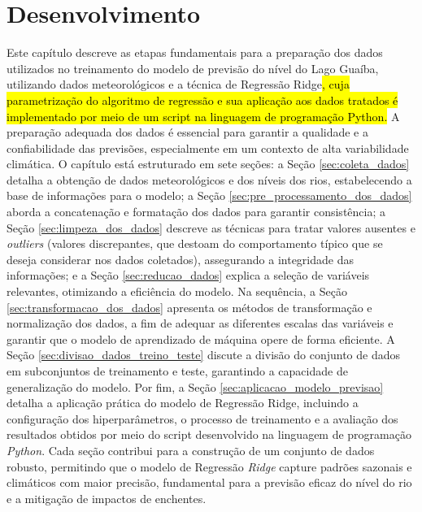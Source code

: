 \chapter{Desenvolvimento}
\label{cap:desenvolvimento}

Este capítulo descreve as etapas fundamentais para a preparação dos dados utilizados no treinamento do modelo de previsão do nível do Lago Guaíba, utilizando dados meteorológicos e a técnica de Regressão Ridge\hl{, cuja parametrização do algoritmo de regressão e sua aplicação aos dados tratados é implementado por meio de um script na linguagem de programação Python.} A preparação adequada dos dados é essencial para garantir a qualidade e a confiabilidade das previsões, especialmente em um contexto de alta variabilidade climática. O capítulo está estruturado em sete seções: a Seção \ref{sec:coleta_dados} detalha a obtenção de dados meteorológicos e dos níveis dos rios, estabelecendo a base de informações para o modelo; a Seção \ref{sec:pre_processamento_dos_dados} aborda a concatenação e formatação dos dados para garantir consistência; a Seção \ref{sec:limpeza_dos_dados} descreve as técnicas para tratar valores ausentes e \textit{outliers} (valores discrepantes, que destoam do comportamento típico que se deseja considerar nos dados coletados), assegurando a integridade das informações; e a Seção \ref{sec:reducao_dados} explica a seleção de variáveis relevantes, otimizando a eficiência do modelo. Na sequência, a Seção \ref{sec:transformacao_dos_dados} apresenta os métodos de transformação e normalização dos dados, a fim de adequar as diferentes escalas das variáveis e garantir que o modelo de aprendizado de máquina opere de forma eficiente. A Seção \ref{sec:divisao_dados_treino_teste} discute a divisão do conjunto de dados em subconjuntos de treinamento e teste, garantindo a capacidade de generalização do modelo. Por fim, a Seção \ref{sec:aplicacao_modelo_previsao} detalha a aplicação prática do modelo de Regressão Ridge, incluindo a configuração dos hiperparâmetros, o processo de treinamento e a avaliação dos resultados obtidos por meio do script desenvolvido na linguagem de programação \textit{Python}. Cada seção contribui para a construção de um conjunto de dados robusto, permitindo que o modelo de Regressão \textit{Ridge} capture padrões sazonais e climáticos com maior precisão, fundamental para a previsão eficaz do nível do rio e a mitigação de impactos de enchentes.

